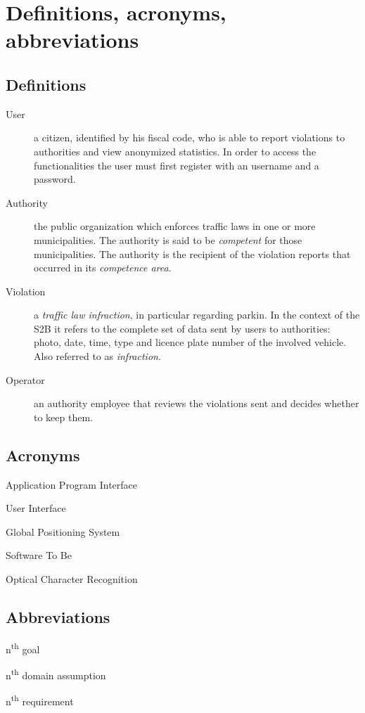 \section{Definitions, acronyms, abbreviations}

\subsection*{Definitions}
\begin{description}
    \item[User] a citizen, identified by his fiscal code, who
    is able to report violations to authorities and view anonymized statistics.
    In order to access the functionalities the user must first register
    with an username and a password.
    \item[Authority] the public organization which enforces traffic
    laws in one or more municipalities.
    The authority is said to be \emph{competent} for those municipalities.
    The authority is the recipient of the violation reports that occurred
    in its \emph{competence area}.
    \item[Violation] a \emph{traffic law infraction}, in particular
    regarding parkin.
    In the context of the S2B it refers to the complete set of data sent by
    users to authorities: photo, date, time, type and licence plate number
    of the involved vehicle. Also referred to as \emph{infraction}.
    \item[Operator] an authority employee that reviews the violations
    sent and decides whether to keep them.
\end{description}

\subsection*{Acronyms}
\begin{description}[noitemsep]
    \item[API] Application Program Interface
    \item[UI] User Interface
    \item[GPS] Global Positioning System
    \item[S2B] Software To Be
    \item[OCR] Optical Character Recognition
\end{description}

\subsection*{Abbreviations}
\begin{description}[noitemsep]
    \item[Gn] n\textsuperscript{th} goal
    \item[Dn] n\textsuperscript{th} domain assumption
    \item[Rn] n\textsuperscript{th} requirement
\end{description}